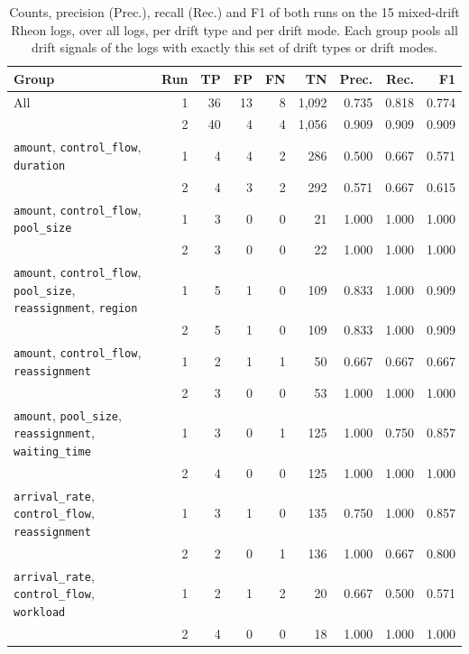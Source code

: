 \begin{table}[htbp]
	\centering
	\caption[Results on the mixed-drift Rheon logs]{%
		Counts, precision (Prec.), recall (Rec.) and F1 of both runs on the 15 mixed-drift Rheon logs, over all logs, per drift type and per drift mode. Each group pools all drift signals of the logs with exactly this set of drift types or drift modes.}
	\label{tab:eval:rheon:mixed}
	\small
	\setlength{\tabcolsep}{3pt}
	\begin{tabular}{@{}>{\raggedright\arraybackslash}p{7.6cm}|r|r|r|r|r|r|r|r@{}}
		\hline
		Group & Run & TP & FP & FN & TN & Prec. & Rec. & F1 \\
		\hline
		All & 1 & 36 & 13 & 8 & 1,092 & 0.735 & 0.818 & 0.774 \\
		 & 2 & 40 & 4 & 4 & 1,056 & 0.909 & 0.909 & 0.909 \\
		\hline
		\texttt{amount}, \texttt{control\_flow}, \texttt{duration} & 1 & 4 & 4 & 2 & 286 & 0.500 & 0.667 & 0.571 \\
		 & 2 & 4 & 3 & 2 & 292 & 0.571 & 0.667 & 0.615 \\
		\texttt{amount}, \texttt{control\_flow}, \texttt{pool\_size} & 1 & 3 & 0 & 0 & 21 & 1.000 & 1.000 & 1.000 \\
		 & 2 & 3 & 0 & 0 & 22 & 1.000 & 1.000 & 1.000 \\
		\texttt{amount}, \texttt{control\_flow}, \texttt{pool\_size}, \texttt{reassignment}, \texttt{region} & 1 & 5 & 1 & 0 & 109 & 0.833 & 1.000 & 0.909 \\
		 & 2 & 5 & 1 & 0 & 109 & 0.833 & 1.000 & 0.909 \\
		\texttt{amount}, \texttt{control\_flow}, \texttt{reassignment} & 1 & 2 & 1 & 1 & 50 & 0.667 & 0.667 & 0.667 \\
		 & 2 & 3 & 0 & 0 & 53 & 1.000 & 1.000 & 1.000 \\
		\texttt{amount}, \texttt{pool\_size}, \texttt{reassignment}, \texttt{waiting\_time} & 1 & 3 & 0 & 1 & 125 & 1.000 & 0.750 & 0.857 \\
		 & 2 & 4 & 0 & 0 & 125 & 1.000 & 1.000 & 1.000 \\
		\texttt{arrival\_rate}, \texttt{control\_flow}, \texttt{reassignment} & 1 & 3 & 1 & 0 & 135 & 0.750 & 1.000 & 0.857 \\
		 & 2 & 2 & 0 & 1 & 136 & 1.000 & 0.667 & 0.800 \\
		\texttt{arrival\_rate}, \texttt{control\_flow}, \texttt{workload} & 1 & 2 & 1 & 2 & 20 & 0.667 & 0.500 & 0.571 \\
		 & 2 & 4 & 0 & 0 & 18 & 1.000 & 1.000 & 1.000 \\

\end{tabular}
\end{table}
